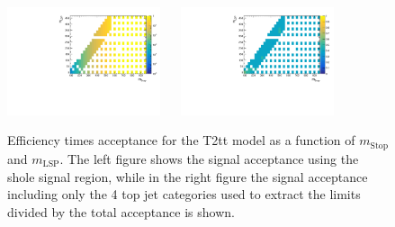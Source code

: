 \begin{figure}[h!]
  \begin{center}
    \includegraphics[width=0.4\textwidth]{figures/jetRanking/T2tt/eff/T2tt_merging_9_cats.pdf} ~~
    \includegraphics[width=0.4\textwidth]{figures/susyResults/T2tt_doubleRatioAcceptance.pdf} \\
    \caption{
      Efficiency times acceptance for the T2tt model as a function of $m_{\mathrm{Stop}}$ and $m_{\mathrm{LSP}}$.
      The left figure shows the signal acceptance using the shole signal region, 
      while in the right figure the signal acceptance including only the 4 top jet categories used to extract the limits divided by the total acceptance is shown.
    }
    \label{fig:sig-eff-T2tt}
  \end{center}
\end{figure}


